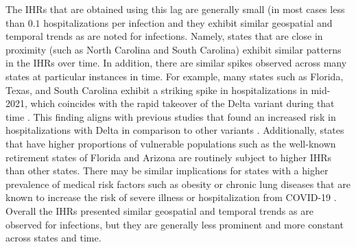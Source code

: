 \documentclass{article}
\begin{document}
The IHRs that are obtained using this lag are generally small (in most cases less than
$0.1$ hospitalizations per infection and they exhibit similar geospatial and temporal trends 
as are noted for infections. Namely, states that are close in proximity (such as North Carolina 
and South Carolina) exhibit similar patterns in the IHRs over time. In addition, there are similar
spikes observed across many states at particular instances in time. For example, many
states such as Florida, Texas, and South Carolina exhibit a striking spike in
hospitalizations in mid-2021, which coincides with the rapid takeover of the Delta variant
during that time \citep{hodcroft2021covariants}. This finding aligns with previous studies
that found an increased risk in hospitalizations with Delta in comparison to other
variants \citep{twohig2022hospital, nyberg2022comparative}. Additionally, states that have
higher proportions of vulnerable populations such as the well-known retirement states of
Florida and Arizona are routinely subject to higher IHRs than other states. There may be
similar implications for states with a higher prevalence of medical risk factors such as
obesity or chronic lung diseases that are known to increase the risk of severe illness or
hospitalization from COVID-19 \citep{phc2020people, cdc2020people}. Overall the IHRs
presented similar geospatial and temporal trends as are observed for infections, but they
are generally less prominent and more constant across states and time. %
\end{document}
